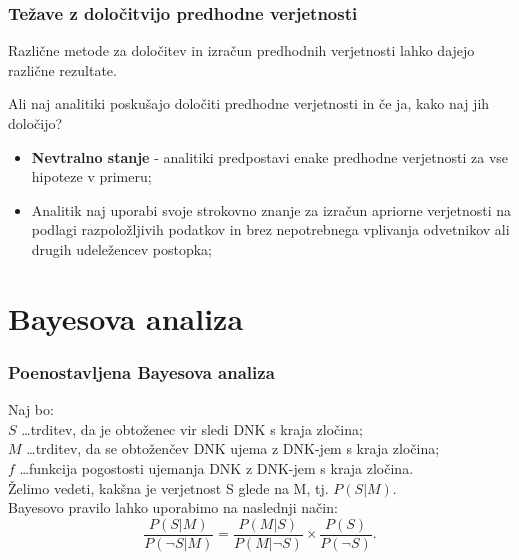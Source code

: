 \documentclass{beamer}
\begin{document}
\begin{frame}
    \frametitle{Težave z določitvijo predhodne verjetnosti}
    Različne metode za določitev in izračun predhodnih verjetnosti lahko dajejo različne rezultate. \\ \vspace{3mm}
    \begin{block}{Ali naj analitiki poskušajo določiti predhodne verjetnosti in če ja, kako naj jih določijo?}
        \begin{itemize}
            \item \textbf{Nevtralno stanje} - analitiki predpostavi enake predhodne verjetnosti za vse hipoteze v primeru;
            \item Analitik naj uporabi svoje strokovno znanje za izračun apriorne verjetnosti na podlagi razpoložljivih podatkov in brez nepotrebnega vplivanja odvetnikov ali drugih udeležencev postopka;
        \end{itemize}
    \end{block}
\end{frame}

\section{Bayesova analiza}

\begin{frame}
    \frametitle{Poenostavljena Bayesova analiza}
    Naj bo:\\
    $S$ \dots trditev, da je obtoženec vir sledi DNK s kraja zločina; \\
    $M$ \dots trditev, da se obtoženčev DNK ujema z DNK-jem s kraja zločina; \\
    $f$ \dots funkcija pogostosti ujemanja DNK z DNK-jem s kraja zločina. \\
    Želimo vedeti, kakšna je verjetnost S glede na M, tj. $P(S \lvert M)$. \\ \vspace{3mm}
    Bayesovo pravilo lahko uporabimo na naslednji način:
    \[
        \frac{P(S \lvert M)}{P(\neg S \lvert M)} = \frac{P(M \lvert S)}{P(M \lvert \neg S)} \times \frac{P(S)}{P(\neg S)}.
    \] 
\end{frame} 
\end{document}
